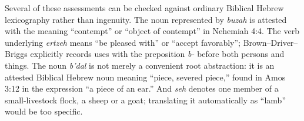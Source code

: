 
Several of these assessments can be checked against ordinary Biblical Hebrew lexicography rather than ingenuity. The noun represented by \textit{buzah} is attested with the meaning ``contempt'' or ``object of contempt'' in Nehemiah 4:4. The verb underlying \textit{ertzeh} means ``be pleased with'' or ``accept favorably''; Brown--Driver--Briggs explicitly records uses with the preposition \textit{b-} before both persons and things. The noun \textit{b'dal} is not merely a convenient root abstraction: it is an attested Biblical Hebrew noun meaning ``piece, severed piece,'' found in Amos 3:12 in the expression ``a piece of an ear.'' And \textit{seh} denotes one member of a small-livestock flock, a sheep or a goat; translating it automatically as ``lamb'' would be too specific.\cite{BDB}

